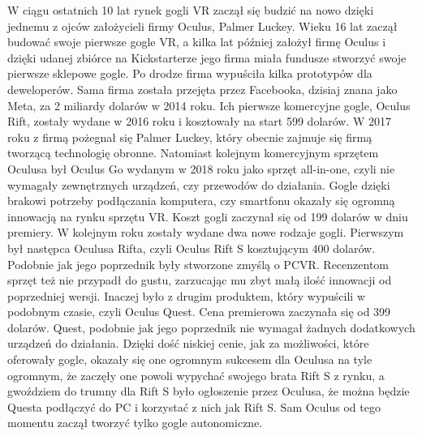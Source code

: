 \documentclass[a4paper,12pt,reqno]{article}
\begin{document}
W ciągu ostatnich 10 lat rynek gogli VR zaczął się budzić na nowo dzięki jednemu z ojców założycieli firmy Oculus, Palmer Luckey. Wieku 16 lat zaczął budować swoje pierwsze gogle VR, a kilka lat później założył firmę Oculus i dzięki udanej zbiórce na Kickstarterze jego firma miała fundusze stworzyć swoje pierwsze sklepowe gogle. Po drodze firma wypuściła kilka prototypów dla deweloperów. Sama firma została przejęta przez Facebooka, dzisiaj znana jako Meta, za 2 miliardy dolarów w 2014 roku. Ich pierwsze komercyjne gogle, Oculus Rift, zostały wydane w 2016 roku i kosztowały na start 599 dolarów. W 2017 roku z firmą pożegnał się Palmer Luckey, który obecnie zajmuje się firmą tworzącą technologię obronne. Natomiast kolejnym komercyjnym sprzętem Oculusa był Oculus Go wydanym w 2018 roku jako sprzęt all-in-one, czyli nie wymagały zewnętrznych urządzeń, czy przewodów do działania. Gogle dzięki brakowi potrzeby podłączania komputera, czy smartfonu okazały się ogromną innowacją na rynku sprzętu VR. Koszt gogli zaczynał się od 199 dolarów w dniu premiery. W kolejnym roku zostały wydane dwa nowe rodzaje gogli. Pierwszym był następca Oculusa Rifta, czyli Oculus Rift S kosztującym 400 dolarów. Podobnie jak jego poprzednik były stworzone zmyślą o PCVR. Recenzentom sprzęt też nie przypadł do gustu, zarzucając mu zbyt małą ilość innowacji od poprzedniej wersji. Inaczej było z drugim produktem, który wypuścili w podobnym czasie, czyli Oculus Quest. Cena premierowa zaczynała się od 399 dolarów. Quest, podobnie jak jego poprzednik nie wymagał żadnych dodatkowych urządzeń do działania. Dzięki dość niskiej cenie, jak za możliwości, które oferowały gogle, okazały się one ogromnym sukcesem dla Oculusa na tyle ogromnym, że zaczęły one powoli wypychać swojego brata Rift S z rynku, a gwoździem do trumny dla Rift S było ogłoszenie przez Oculusa, że można będzie Questa podłączyć do PC i korzystać z nich jak Rift S. Sam Oculus od tego momentu zaczął tworzyć tylko gogle autonomiczne.
\end{document}
